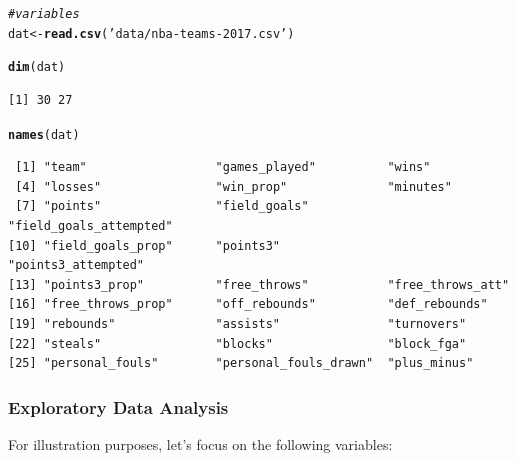 \documentclass[12pt]{beamer}\usepackage[]{graphicx}\usepackage[]{color}
\makeatletter
\newcommand{\hlstr}[1]{\textcolor[rgb]{0.192,0.494,0.8}{#1}}%
\newcommand{\hlcom}[1]{\textcolor[rgb]{0.678,0.584,0.686}{\textit{#1}}}%
\newcommand{\hlstd}[1]{\textcolor[rgb]{0.345,0.345,0.345}{#1}}%
\newcommand{\hlkwb}[1]{\textcolor[rgb]{0.69,0.353,0.396}{#1}}%
\newcommand{\hlkwd}[1]{\textcolor[rgb]{0.737,0.353,0.396}{\textbf{#1}}}%
\newenvironment{kframe}{%
 \def\at@end@of@kframe{}%
 \ifinner\ifhmode%
  \def\at@end@of@kframe{\end{minipage}}%
  \begin{minipage}{\columnwidth}%
 \fi\fi%
 \def\FrameCommand##1{\hskip\@totalleftmargin \hskip-\fboxsep
 \colorbox{shadecolor}{##1}\hskip-\fboxsep
     \hskip-\linewidth \hskip-\@totalleftmargin \hskip\columnwidth}%
 \MakeFramed {\advance\hsize-\width
   \@totalleftmargin\z@ \linewidth\hsize
   \@setminipage}}%
 {\par\unskip\endMakeFramed%
 \at@end@of@kframe}
\newenvironment{knitrout}{}{} %
\makeatother
\begin{document}
\begin{frame}[fragile]

\begin{knitrout}\scriptsize
{}\color{fgcolor}\begin{kframe}
\begin{alltt}
\hlcom{# variables}
\hlstd{dat} \hlkwb{<-} \hlkwd{read.csv}\hlstd{(}\hlstr{'data/nba-teams-2017.csv'}\hlstd{)}
\end{alltt}
\end{kframe}
\end{knitrout}



\begin{knitrout}\scriptsize
{}\color{fgcolor}\begin{kframe}
\begin{alltt}
\hlkwd{dim}\hlstd{(dat)}
\end{alltt}
\begin{verbatim}
[1] 30 27
\end{verbatim}
\begin{alltt}
\hlkwd{names}\hlstd{(dat)}
\end{alltt}
\begin{verbatim}
 [1] "team"                  "games_played"          "wins"                 
 [4] "losses"                "win_prop"              "minutes"              
 [7] "points"                "field_goals"           "field_goals_attempted"
[10] "field_goals_prop"      "points3"               "points3_attempted"    
[13] "points3_prop"          "free_throws"           "free_throws_att"      
[16] "free_throws_prop"      "off_rebounds"          "def_rebounds"         
[19] "rebounds"              "assists"               "turnovers"            
[22] "steals"                "blocks"                "block_fga"            
[25] "personal_fouls"        "personal_fouls_drawn"  "plus_minus"           
\end{verbatim}
\end{kframe}
\end{knitrout}

\end{frame}


\begin{frame}
\frametitle{Exploratory Data Analysis}

For illustration purposes, let's focus on the following variables:
\bi
  \item {}
  \item {}
  \item {}
  \item {}
  \item {}
  \item {}
  \item {}
  \item {}
\ei

\end{frame}
\end{document}
